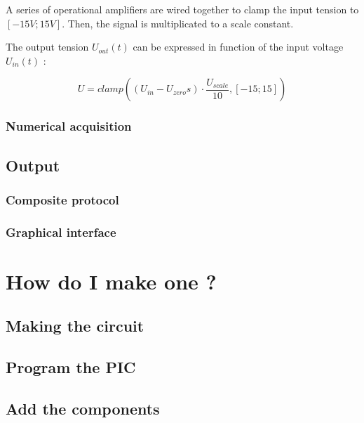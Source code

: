 \documentclass[11pt]{article}
\begin{document}
A series of operational amplifiers are wired together to clamp the input tension to $[-15V;15V]$. Then, the signal is multiplicated to a scale constant.

The output tension $U_{out}(t)$ can be expressed in function of the input voltage $U_{in}(t)$ :

\[ U = clamp((U_{in} - U_{zero}s) \cdot \frac{U_{scale}}{10}, [-15;15]) \]



\subsubsection{Numerical acquisition}

\subsection{Output}

\subsubsection{Composite protocol}

\subsubsection{Graphical interface}


\section {How do I make one ?}

\subsection{Making the circuit}

\subsection{Program the PIC}

\subsection{Add the components}
\end{document}
